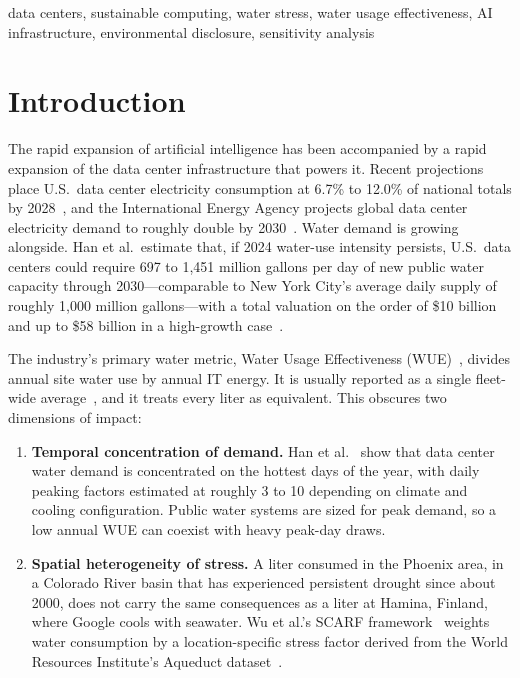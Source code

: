 \documentclass[conference,10pt]{IEEEtran}
\begin{document}
\begin{IEEEkeywords}
data centers, sustainable computing, water stress, water usage effectiveness,
AI infrastructure, environmental disclosure, sensitivity analysis
\end{IEEEkeywords}

\section{Introduction}
\label{sec:introduction}

The rapid expansion of artificial intelligence has been accompanied by a
rapid expansion of the data center infrastructure that powers it. Recent
projections place U.S.\ data center electricity consumption at 6.7\% to
12.0\% of national totals by 2028~\cite{lbnl2024}, and the International
Energy Agency projects global data center electricity demand to roughly
double by 2030~\cite{iea2025}. Water demand is growing alongside. Han et
al.\ estimate that, if 2024 water-use intensity persists, U.S.\ data centers
could require 697 to 1{,}451 million gallons per day of new public water
capacity through 2030---comparable to New York City's average daily supply of
roughly 1{,}000 million gallons---with a total valuation on the order of
\$10 billion and up to \$58 billion in a high-growth case~\cite{han2026}.

The industry's primary water metric, Water Usage Effectiveness
(WUE)~\cite{greengrid2011wue}, divides annual site water use by annual IT
energy. It is usually reported as a single fleet-wide
average~\cite{microsoft2025efficiency, meta2025edi, aws2023summary}, and it
treats every liter as equivalent. This obscures two dimensions of impact:

\begin{enumerate}
    \item \textbf{Temporal concentration of demand.} Han et
        al.~\cite{han2026} show that data center water demand is
        concentrated on the hottest days of the year, with daily peaking
        factors estimated at roughly 3 to 10 depending on climate and cooling
        configuration. Public water systems are sized for peak demand, so a
        low annual WUE can coexist with heavy peak-day draws.
    \item \textbf{Spatial heterogeneity of stress.} A liter consumed in the
        Phoenix area, in a Colorado River basin that has experienced
        persistent drought since about 2000, does not carry the same
        consequences as a liter at Hamina, Finland, where Google cools with
        seawater. Wu et al.'s SCARF framework~\cite{wu2025scarf} weights
        water consumption by a location-specific stress factor derived from
        the World Resources Institute's Aqueduct
        dataset~\cite{kuzma2023aqueduct}.
\end{enumerate}
\end{document}
